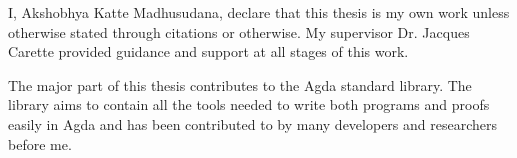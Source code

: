 
I, Akshobhya Katte Madhusudana, declare that this thesis is my own work unless
otherwise stated through citations or otherwise. My supervisor Dr. Jacques
Carette provided guidance and support at all stages of this work.

The major part of this thesis contributes to the Agda standard library. The library aims
to contain all the tools needed to write both programs and proofs easily in Agda
and has been contributed to by many developers and researchers before me.